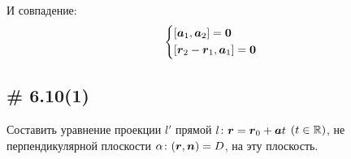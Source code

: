 \documentclass[a4paper,12pt]{article}
\begin{document}
\begin{solution}
    И совпадение:
    \[
      \left\{
        \begin{aligned}
          &[\boldsymbol a_1, \boldsymbol a_2] = \boldsymbol 0\\
          &[\boldsymbol r_2 - \boldsymbol r_1, \boldsymbol a_1] = \boldsymbol 0
        \end{aligned}
      \right.
    \]
  \end{solution}
  
  
  
  \subsection{\# 6.10(1)}
  
  \begin{problem}
    Составить уравнение проекции $l'$ прямой $l\colon \bds r \hm= \bds r_0 \hm+ \bds a t$ $(t \hm\in \RR)$, не перпендикулярной плоскости $\alpha\colon (\bds r, \bds n) \hm= D$, на эту плоскость.
  \end{problem}
  
\end{document}
